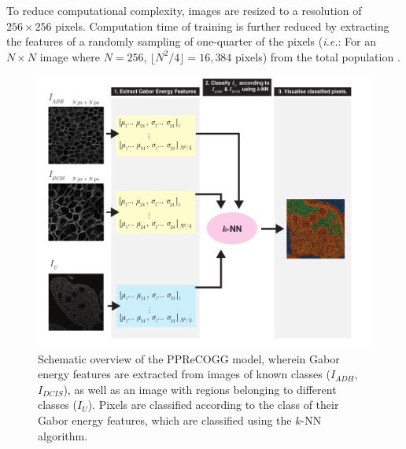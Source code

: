 To reduce computational complexity, images are resized to a resolution of
$256\times256$ pixels. Computation time of training is further reduced by
extracting the features of a randomly sampling of one-quarter of the pixels 
(\emph{i.e.}: For an $N \times N$ image where $N=256$, $\lfloor N^2/4 \rfloor = 16,384$ pixels) from the total population .

\begin{figure}[ht!]
	\centering
	\includegraphics[width=180mm]{figures/pprecogg_summary.pdf}
	\caption{Schematic overview of the PPReCOGG model, wherein Gabor energy features are extracted from images of known classes ($I_{ADH}$, $I_{DCIS}$), as well as an image with regions belonging to different classes ($I_U$). Pixels are classified according to the class of their Gabor energy features, which are classified using the $k$-NN algorithm. \label{pprecogg_summary}}

\end{figure}







